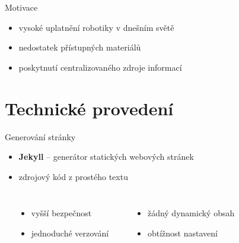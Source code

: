 \documentclass[14pt, hyperref={unicode}]{beamer}
\title{\makebox[\linewidth]{Robotika jednoduše}}
\date{\today}
\author{Tomáš Sláma}
\institute{Gymnázium Turnov}
\newcommand{\Plus}{\fixfaIcon{Plus}}
\newcommand{\Minus}{\fixfaIcon{Minus}}
\begin{document}
  \maketitle

  \begin{frame}{Motivace}
    \begin{itemize}[<+->]
      \item vysoké uplatnění robotiky v dnešním světě
      \item nedostatek přístupných materiálů
      \item poskytnutí centralizovaného zdroje informací
    \end{itemize}
  \end{frame}

  \section{Technické provedení}

  \begin{frame}{Generování stránky}
    \begin{itemize}[<+->]
      \item \textbf{Jekyll} -- generátor statických webových stránek
      \item zdrojový kód z prostého textu
    \end{itemize}

    \vspace{\baselineskip}

    \begin{columns}[b, onlytextwidth]
      \setlength\topsep{0pt}
      \small
        \begin{center}
          \large
          \Plus
        \end{center}
        \begin{itemize}[<+->]
          \itemsep0em
          \item vyšší bezpečnost
          \item jednoduché verzování
        \end{itemize}
        \begin{center}
          \large
          \Minus
        \end{center}
        \begin{itemize}[<+->]
          \itemsep0em
          \item žádný dynamický obsah
          \item obtížnost nastavení
        \end{itemize}
    \end{columns}
  \end{frame}
\end{document}
